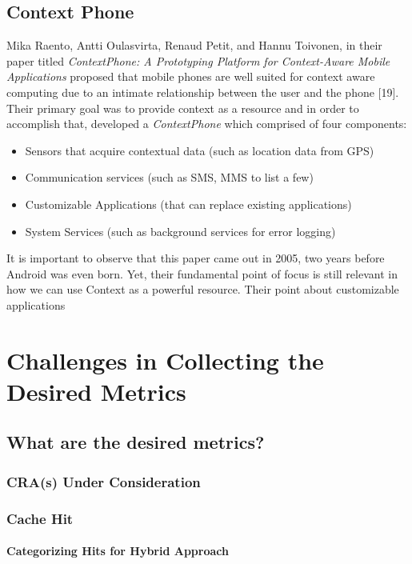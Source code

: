 \documentclass[12pt]{uthesis-v12}  %
\begin{document}
	\section{Context Phone}
		Mika Raento, Antti Oulasvirta, Renaud Petit, and Hannu Toivonen, in their paper titled {\em ContextPhone: A Prototyping Platform for Context-Aware Mobile Applications} proposed that mobile phones are well suited for context aware computing due to an intimate relationship between the user and the phone [19]. Their primary goal was to provide context as a resource and in order to accomplish that, developed a {\em ContextPhone} which comprised of four components:
		
		\begin{itemize}
			\item Sensors that acquire contextual data (such as location data from GPS)
			\item Communication services (such as SMS, MMS to list a few)
			\item Customizable Applications (that can replace existing applications)
			\item System Services (such as background services for error logging)
		\end{itemize}
		
		It is important to observe that this paper came out in 2005, two years before Android was even born. Yet, their fundamental point of focus is still relevant in how we can use Context as a powerful resource. Their point about customizable applications
\chapter{Challenges in Collecting the Desired Metrics}
	
	\section{What are the desired metrics?}
		
		\subsection{CRA(s) Under Consideration}
		
		\subsection{Cache Hit}
			
			\subsubsection{Categorizing Hits for Hybrid Approach}
		
\end{document}
